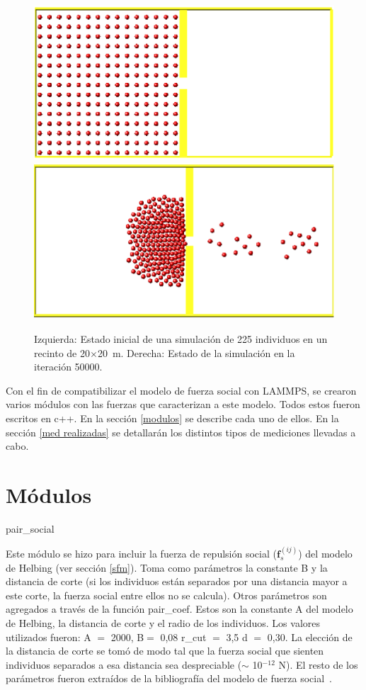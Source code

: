 \begin{figure}[H]
    \centering
    \includegraphics[scale=0.45]{figuras/0.eps}   
    \includegraphics[scale=0.45]{figuras/500.eps}
     \caption[width=5cm]{Izquierda: Estado inicial de una simulación de 225 individuos en un recinto de 20$\times$20~m. Derecha: Estado de la simulación en la iteración 50000. }
    \label{sim}
\end{figure}

Con el fin de compatibilizar el modelo de fuerza social con LAMMPS, se crearon varios módulos con las fuerzas que caracterizan a este modelo. Todos estos fueron escritos en c++. En la  sección \ref{modulos} se describe cada uno de ellos. 
En la sección \ref{med realizadas} se detallarán los distintos tipos de mediciones llevadas a cabo.



\section{\label{modulos}Módulos}

{\Large pair\_social}

Este módulo se hizo para incluir la fuerza de repulsión social ($\mathbf{f}_s^{(ij)}$) del modelo de Helbing (ver sección \ref{sfm}). Toma como parámetros la constante B y la distancia de corte (si los individuos están separados por una distancia mayor a este corte, la fuerza social entre ellos no se calcula).
Otros parámetros son agregados a través de la función pair\_coef. Estos son la constante A del modelo de Helbing, la distancia 
de corte y el radio de los individuos. Los valores utilizados fueron: A $=$ 2000, B$=$ 0,08 r\_cut $=$ 3,5 d $=$ 0,30.
La elección de la distancia de corte se tomó de modo tal que la fuerza social que sienten individuos separados a esa distancia
sea despreciable ($\sim$ 10$^{-12}$ N). El resto de los parámetros fueron extraídos de la bibliografía del modelo de fuerza social~\cite{Helbing1}.

